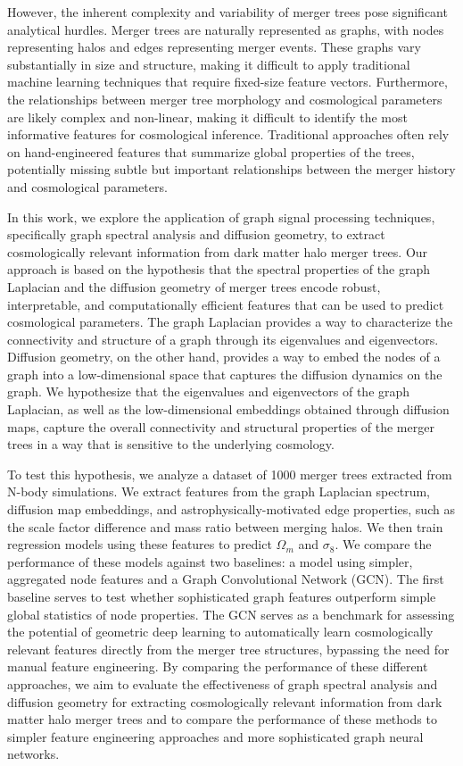 \documentclass[twocolumn]{aastex631}
\begin{document}
However, the inherent complexity and variability of merger trees pose significant analytical hurdles. Merger trees are naturally represented as graphs, with nodes representing halos and edges representing merger events. These graphs vary substantially in size and structure, making it difficult to apply traditional machine learning techniques that require fixed-size feature vectors. Furthermore, the relationships between merger tree morphology and cosmological parameters are likely complex and non-linear, making it difficult to identify the most informative features for cosmological inference. Traditional approaches often rely on hand-engineered features that summarize global properties of the trees, potentially missing subtle but important relationships between the merger history and cosmological parameters.

In this work, we explore the application of graph signal processing techniques, specifically graph spectral analysis and diffusion geometry, to extract cosmologically relevant information from dark matter halo merger trees. Our approach is based on the hypothesis that the spectral properties of the graph Laplacian and the diffusion geometry of merger trees encode robust, interpretable, and computationally efficient features that can be used to predict cosmological parameters. The graph Laplacian provides a way to characterize the connectivity and structure of a graph through its eigenvalues and eigenvectors. Diffusion geometry, on the other hand, provides a way to embed the nodes of a graph into a low-dimensional space that captures the diffusion dynamics on the graph. We hypothesize that the eigenvalues and eigenvectors of the graph Laplacian, as well as the low-dimensional embeddings obtained through diffusion maps, capture the overall connectivity and structural properties of the merger trees in a way that is sensitive to the underlying cosmology.

To test this hypothesis, we analyze a dataset of 1000 merger trees extracted from N-body simulations. We extract features from the graph Laplacian spectrum, diffusion map embeddings, and astrophysically-motivated edge properties, such as the scale factor difference and mass ratio between merging halos. We then train regression models using these features to predict $\Omega_m$ and $\sigma_8$. We compare the performance of these models against two baselines: a model using simpler, aggregated node features and a Graph Convolutional Network (GCN). The first baseline serves to test whether sophisticated graph features outperform simple global statistics of node properties. The GCN serves as a benchmark for assessing the potential of geometric deep learning to automatically learn cosmologically relevant features directly from the merger tree structures, bypassing the need for manual feature engineering. By comparing the performance of these different approaches, we aim to evaluate the effectiveness of graph spectral analysis and diffusion geometry for extracting cosmologically relevant information from dark matter halo merger trees and to compare the performance of these methods to simpler feature engineering approaches and more sophisticated graph neural networks.
\end{document}
